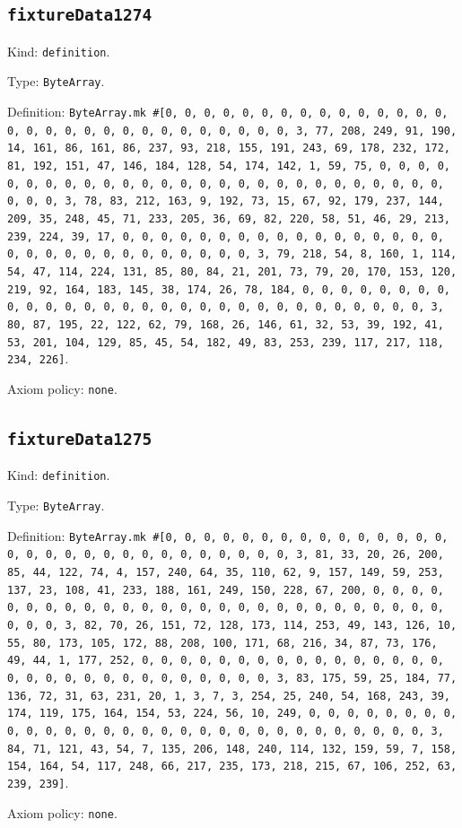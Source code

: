 \documentclass[11pt]{article}
\begin{document}
\subsection*{\texttt{fixtureData1274}}
\noindent Kind: \texttt{definition}.\par
\noindent Type: \texttt{ByteArray}.\par
\noindent Definition: \texttt{ByteArray.mk \#[0, 0, 0, 0, 0, 0, 0, 0, 0, 0, 0, 0, 0, 0, 0, 0, 0, 0, 0, 0, 0, 0, 0, 0, 0, 0, 0, 0, 0, 0, 3, 77, 208, 249, 91, 190, 14, 161, 86, 161, 86, 237, 93, 218, 155, 191, 243, 69, 178, 232, 172, 81, 192, 151, 47, 146, 184, 128, 54, 174, 142, 1, 59, 75, 0, 0, 0, 0, 0, 0, 0, 0, 0, 0, 0, 0, 0, 0, 0, 0, 0, 0, 0, 0, 0, 0, 0, 0, 0, 0, 0, 0, 0, 0, 3, 78, 83, 212, 163, 9, 192, 73, 15, 67, 92, 179, 237, 144, 209, 35, 248, 45, 71, 233, 205, 36, 69, 82, 220, 58, 51, 46, 29, 213, 239, 224, 39, 17, 0, 0, 0, 0, 0, 0, 0, 0, 0, 0, 0, 0, 0, 0, 0, 0, 0, 0, 0, 0, 0, 0, 0, 0, 0, 0, 0, 0, 0, 0, 3, 79, 218, 54, 8, 160, 1, 114, 54, 47, 114, 224, 131, 85, 80, 84, 21, 201, 73, 79, 20, 170, 153, 120, 219, 92, 164, 183, 145, 38, 174, 26, 78, 184, 0, 0, 0, 0, 0, 0, 0, 0, 0, 0, 0, 0, 0, 0, 0, 0, 0, 0, 0, 0, 0, 0, 0, 0, 0, 0, 0, 0, 0, 0, 3, 80, 87, 195, 22, 122, 62, 79, 168, 26, 146, 61, 32, 53, 39, 192, 41, 53, 201, 104, 129, 85, 45, 54, 182, 49, 83, 253, 239, 117, 217, 118, 234, 226]}.\par
\noindent Axiom policy: \texttt{none}.\par
\subsection*{\texttt{fixtureData1275}}
\noindent Kind: \texttt{definition}.\par
\noindent Type: \texttt{ByteArray}.\par
\noindent Definition: \texttt{ByteArray.mk \#[0, 0, 0, 0, 0, 0, 0, 0, 0, 0, 0, 0, 0, 0, 0, 0, 0, 0, 0, 0, 0, 0, 0, 0, 0, 0, 0, 0, 0, 0, 3, 81, 33, 20, 26, 200, 85, 44, 122, 74, 4, 157, 240, 64, 35, 110, 62, 9, 157, 149, 59, 253, 137, 23, 108, 41, 233, 188, 161, 249, 150, 228, 67, 200, 0, 0, 0, 0, 0, 0, 0, 0, 0, 0, 0, 0, 0, 0, 0, 0, 0, 0, 0, 0, 0, 0, 0, 0, 0, 0, 0, 0, 0, 0, 3, 82, 70, 26, 151, 72, 128, 173, 114, 253, 49, 143, 126, 10, 55, 80, 173, 105, 172, 88, 208, 100, 171, 68, 216, 34, 87, 73, 176, 49, 44, 1, 177, 252, 0, 0, 0, 0, 0, 0, 0, 0, 0, 0, 0, 0, 0, 0, 0, 0, 0, 0, 0, 0, 0, 0, 0, 0, 0, 0, 0, 0, 0, 0, 3, 83, 175, 59, 25, 184, 77, 136, 72, 31, 63, 231, 20, 1, 3, 7, 3, 254, 25, 240, 54, 168, 243, 39, 174, 119, 175, 164, 154, 53, 224, 56, 10, 249, 0, 0, 0, 0, 0, 0, 0, 0, 0, 0, 0, 0, 0, 0, 0, 0, 0, 0, 0, 0, 0, 0, 0, 0, 0, 0, 0, 0, 0, 0, 3, 84, 71, 121, 43, 54, 7, 135, 206, 148, 240, 114, 132, 159, 59, 7, 158, 154, 164, 54, 117, 248, 66, 217, 235, 173, 218, 215, 67, 106, 252, 63, 239, 239]}.\par
\noindent Axiom policy: \texttt{none}.\par
\end{document}
